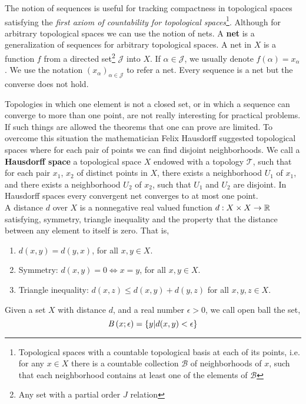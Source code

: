 The notion of sequences is useful for tracking compactness in topological spaces satisfying the \emph{first axiom of countability for topological spaces}\footnote{Topological spaces with a countable topological basis at each of its points, i.e. for any $x\in X$ there is a countable collection $\mathcal{B}$ of neighborhoods of $x$, such that each neighborhood contains at least one of the elements of $\mathcal{B}$}. Although for arbitrary topological spaces we can use the notion of nets. A \textbf{net} is a generalization of sequences for arbitrary topological spaces. A net in $X$ is a function $f$ from a directed set\footnote{Any set with a partial order $J$ relation} $\mathcal{J}$ into $X$. If $\alpha \in \mathcal{J}$, we usually denote $f(\alpha)=x_\alpha$. We use the notation $(x_\alpha)_{\alpha \in \mathcal{J}}$ to refer a net. Every sequence is a net but the converse does not hold.

Topologies in which one element is not a closed set, or in which a sequence can converge to more than one point, are not really interesting for practical problems. If such things are allowed the theorems that one can prove are limited. To overcome this situation the mathematician Felix Hausdorff suggested topological spaces where for each pair of points we can find disjoint neighborhoods. We call a \textbf{Hausdorff space} a topological space $X$ endowed with a topology $\mathcal{T}$, such that for each pair $x_1$, $x_2$ of distinct points in $X$, there exists a neighborhood $U_1$ of $x_1$, and there exists a neighborhood $U_2$ of $x_2$, such that $U_1$ and $U_2$ are disjoint.  In Hausdorff spaces every convergent net converges to at most one point. 
\\

A distance $d$ over $X$ is a nonnegative real valued function $d:X\times X\rightarrow \mathbb{R}$ satisfying, symmetry, triangle inequality and the property that the distance between any element to itself is zero. That is,
\begin{enumerate}
	\item $d(x, y)=d(y,x)$, for all $x,y \in X$.
	\item Symmetry: $d(x,y)=0 \iff x=y$, for all $x,y \in X$. 
	\item Triangle inequality: $d(x,z)\leq d(x,y)+d(y,z)$ for all $x,y,z\in X$.
\end{enumerate}
Given a set $X$ with distance $d$, and a real number $\epsilon >0$, we call open ball the set,
\begin{equation*}
	\mathit{B}\left( x; \epsilon \right)=\left\lbrace y| d(x,y)<\epsilon \right\rbrace
\end{equation*} 

